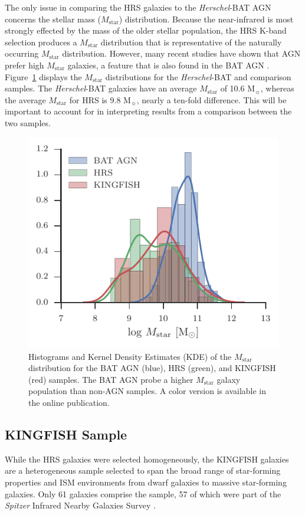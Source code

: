 \documentclass[fleqn, usenatbib]{mnras}
\newcommand{\herschel}{\emph{Herschel}}
\newcommand{\msun}{M$_{\sun}$}
\newcommand{\mstar}{$M_{\mathrm{star}}$}
\begin{document}
The only issue in comparing the HRS galaxies to the \herschel-BAT AGN concerns the stellar mass (\mstar) distribution. Because the near-infrared is most strongly effected by the mass of the older stellar population, the HRS K-band selection produces a \mstar{} distribution that is representative of the naturally occurring \mstar{} distribution. However, many recent studies have shown that AGN prefer high \mstar{} galaxies, a feature that is also found in the BAT AGN \citep{Koss:2011vn}. Figure~\ref{fig:mstar_dist} displays the \mstar{} distributions for the \herschel-BAT and comparison samples. The \herschel-BAT galaxies have an average \mstar{} of 10.6 \msun, whereas the average \mstar{} for HRS is 9.8 \msun, nearly a ten-fold difference. This will be important to account for in interpreting results from a comparison between the two samples.

\begin{figure}
\includegraphics[width=\columnwidth]{figures/stellar_mass_comp}
\caption{Histograms and Kernel Density Estimates (KDE) of the \mstar{} distribution for the BAT AGN (blue), HRS (green), and KINGFISH (red) samples. The BAT AGN probe a higher \mstar{} galaxy population than non-AGN samples. A color version is available in the online publication. \label{fig:mstar_dist}}
\end{figure}

\subsection{KINGFISH Sample}
While the HRS galaxies were selected homogeneously, the KINGFISH galaxies are a heterogeneous sample selected to span the broad range of star-forming properties and ISM environments from dwarf galaxies to massive star-forming galaxies. Only 61 galaxies comprise the sample, 57 of which were part of the \textit{Spitzer} Infrared Nearby Galaxies Survey \citep[SINGS;][]{Kennicutt:2003wk}.
\end{document}
